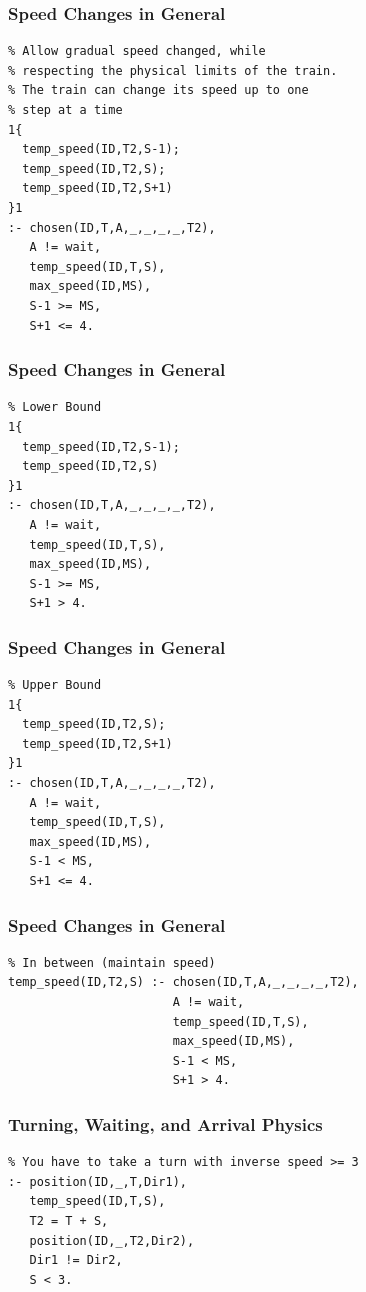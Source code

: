 \documentclass{beamer}
\begin{document}
\begin{frame}[fragile]
\frametitle{Speed Changes in General}
\begin{verbatim}
% Allow gradual speed changed, while
% respecting the physical limits of the train.
% The train can change its speed up to one
% step at a time
1{
  temp_speed(ID,T2,S-1);
  temp_speed(ID,T2,S);
  temp_speed(ID,T2,S+1)
}1 
:- chosen(ID,T,A,_,_,_,_,T2),
   A != wait,
   temp_speed(ID,T,S),
   max_speed(ID,MS),
   S-1 >= MS,
   S+1 <= 4.

\end{verbatim}
\end{frame}

\begin{frame}[fragile]
\frametitle{Speed Changes in General}
\begin{verbatim}
% Lower Bound
1{
  temp_speed(ID,T2,S-1);
  temp_speed(ID,T2,S)
}1
:- chosen(ID,T,A,_,_,_,_,T2),
   A != wait,
   temp_speed(ID,T,S),
   max_speed(ID,MS),
   S-1 >= MS,
   S+1 > 4.
\end{verbatim}
\end{frame}

\begin{frame}[fragile]
\frametitle{Speed Changes in General}
\begin{verbatim}
% Upper Bound
1{
  temp_speed(ID,T2,S);
  temp_speed(ID,T2,S+1)
}1
:- chosen(ID,T,A,_,_,_,_,T2),
   A != wait,
   temp_speed(ID,T,S),
   max_speed(ID,MS),
   S-1 < MS,
   S+1 <= 4.
\end{verbatim}
\end{frame}

\begin{frame}[fragile]
\frametitle{Speed Changes in General}
\begin{verbatim}
% In between (maintain speed)
temp_speed(ID,T2,S) :- chosen(ID,T,A,_,_,_,_,T2),
                       A != wait,
                       temp_speed(ID,T,S),
                       max_speed(ID,MS),
                       S-1 < MS,
                       S+1 > 4.
\end{verbatim}
\end{frame}

\begin{frame}[fragile]
\frametitle{Turning, Waiting, and Arrival Physics}
\begin{verbatim}
% You have to take a turn with inverse speed >= 3 
:- position(ID,_,T,Dir1),
   temp_speed(ID,T,S),
   T2 = T + S,
   position(ID,_,T2,Dir2),
   Dir1 != Dir2,
   S < 3.
\end{verbatim}
\end{frame}
\end{document}
